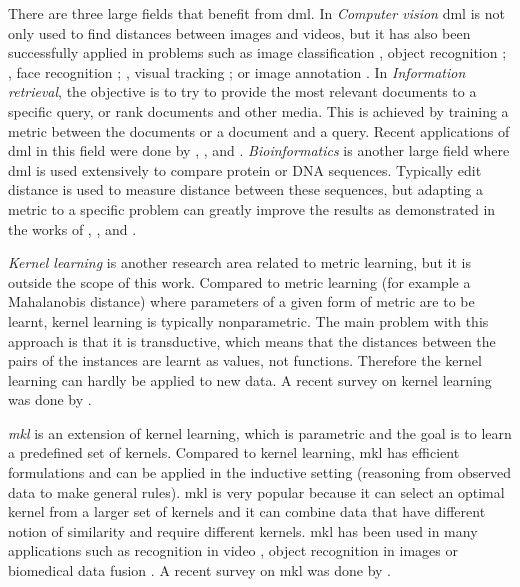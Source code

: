 \documentclass[12pt,a4paper]{report}
\begin{document}
There are three large fields that benefit from \acl{dml}. In \textit{Computer vision} \ac{dml} is not only used to find distances between images and videos, but it has also been successfully applied in problems such as image classification \citep{mensink2012metric}, object recognition \citep{frome2007learning}; \citep{verma2012learning}, face recognition \citep{guillaumin2009you}; \citep{lu2014neighborhood}, visual tracking \citep{li2012non}; \citep{jiang2012order} or image annotation \citep{guillaumin2009tagprop}. In \textit{Information retrieval}, the objective is to try to provide the most relevant documents to a specific query, or rank documents and other media. This is achieved by training a metric between the documents or a document and a query. Recent applications of \acl{dml} in this field were done by \citep{lebanon2006metric}, \citep{lee2008rank}, \citep{mcfee2010metric} and \citep{lim2013robust}. \textit{Bioinformatics} is another large field where \acl{dml} is used extensively to compare protein or DNA sequences. Typically edit distance is used to measure distance between these sequences, but adapting a metric to a specific problem can greatly improve the results as demonstrated in the works of \citep{xiong2006kernel}, \citep{saigo2006optimizing}, \citep{kato2010metric} and \citep{wang2012prodis}.

\textit{Kernel learning} is another research area related to metric learning, but it is outside the scope of this work. Compared to metric learning (for example a Mahalanobis distance) where parameters of a given form of metric are to be learnt, kernel learning is typically nonparametric. The main problem with this approach is that it is transductive, which means that the distances between the pairs of the instances are learnt as values, not functions. Therefore the kernel learning can hardly be applied to new data. A recent survey on kernel learning was done by \citep{abbasnejad2012survey}.

\textit{\Ac{mkl}} \citep{gonen2011multiple} is an extension of kernel learning, which is parametric and the goal is to learn a predefined set of kernels. Compared to kernel learning, \ac{mkl} has efficient formulations and can be applied in the inductive setting (reasoning from observed data to make general rules). \Ac{mkl} is very popular because it can select an optimal kernel from a larger set of kernels and it can combine data that have different notion of similarity and require different kernels. \ac{mkl} has been used in many applications such as recognition in video \citep{chen2013event}, object recognition in images \citep{bucak2014multiple} or biomedical data fusion \citep{yu20102}. A recent survey on \ac{mkl} was done by \citep{gonen2011multiple}.
\end{document}

